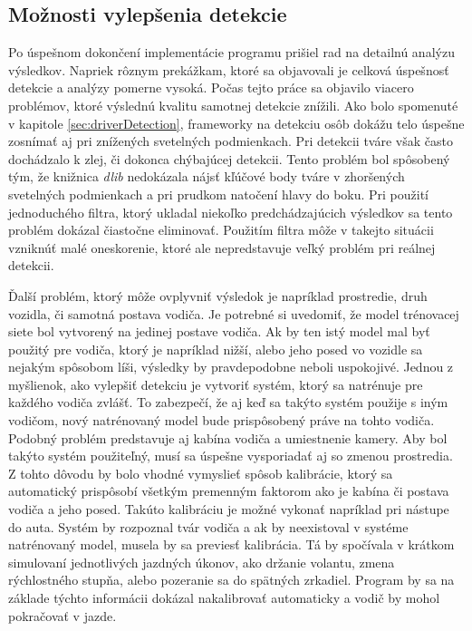\documentclass[slovak,master,dept460,male,cpp,cpdeclaration]{diploma}
\begin{document}
\newpage
\subsection{Možnosti vylepšenia detekcie}
\label{sec:Možnosti vylepšenia detekcie}
Po úspešnom dokončení implementácie programu prišiel rad na detailnú analýzu výsledkov. Napriek  rôznym prekážkam, ktoré sa objavovali je celková úspešnosť detekcie a analýzy pomerne vysoká. Počas tejto práce sa objavilo viacero problémov, ktoré výslednú kvalitu samotnej detekcie  znížili. Ako bolo spomenuté v kapitole \ref{sec:driverDetection}, frameworky na detekciu osôb dokážu telo úspešne zosnímať aj pri  znížených svetelných podmienkach. Pri detekcii tváre však  často dochádzalo k zlej, či dokonca chýbajúcej detekcii. Tento problém  bol spôsobený tým, že knižnica \textit{dlib} nedokázala nájsť kľúčové body tváre v zhoršených svetelných podmienkach a pri prudkom natočení hlavy do boku. Pri použití jednoduchého filtra, ktorý ukladal  niekoľko predchádzajúcich výsledkov sa tento problém dokázal čiastočne eliminovať. Použitím filtra môže  v takejto situácii vzniknúť malé oneskorenie, ktoré ale nepredstavuje veľký problém pri reálnej detekcii.\par
Ďalší problém, ktorý môže ovplyvniť výsledok je napríklad prostredie, druh vozidla, či samotná postava vodiča. Je potrebné si uvedomiť, že model trénovacej siete bol vytvorený na jedinej postave vodiča. Ak by ten istý model mal byť použitý pre vodiča, ktorý je napríklad nižší, alebo jeho posed vo vozidle sa nejakým spôsobom líši, výsledky by pravdepodobne neboli uspokojivé. Jednou z myšlienok, ako vylepšiť detekciu je  vytvoriť systém, ktorý  sa natrénuje pre každého vodiča zvlášť. To zabezpečí, že aj keď sa takýto systém použije s iným vodičom,  nový natrénovaný model bude prispôsobený práve na tohto vodiča. Podobný problém predstavuje aj kabína vodiča a umiestnenie kamery. Aby bol takýto systém použiteľný, musí sa úspešne vysporiadať aj so zmenou prostredia. Z tohto dôvodu by bolo vhodné vymyslieť spôsob kalibrácie, ktorý sa automatický prispôsobí všetkým premenným faktorom ako je kabína či postava vodiča a jeho posed. Takúto kalibráciu je možné vykonať napríklad pri nástupe do auta. Systém by rozpoznal tvár vodiča a ak by neexistoval v systéme natrénovaný model, musela by sa previesť kalibrácia. Tá by spočívala v krátkom simulovaní jednotlivých jazdných  úkonov, ako držanie volantu, zmena rýchlostného stupňa, alebo pozeranie sa do spätných zrkadiel. Program by sa na základe týchto informácii dokázal nakalibrovať automaticky a vodič by mohol pokračovať v jazde. 
\end{document}
